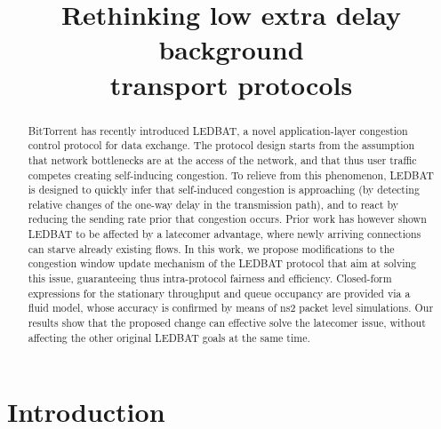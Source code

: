 \documentclass[conference]{IEEEtran}
\begin{document}
\title{Rethinking low extra delay background\\ transport protocols}
\author{
}

\maketitle

\begin{abstract}
BitTorrent has recently introduced LEDBAT, a novel application-layer congestion control protocol for data exchange. The protocol design starts from the assumption that network bottlenecks are at the access of the network, and that thus user traffic competes creating self-inducing congestion. To relieve from this phenomenon, LEDBAT is designed to quickly infer that self-induced congestion is approaching (by detecting  relative changes of the one-way delay in the transmission path), and to react by reducing the sending rate prior that congestion occurs. Prior work has however shown LEDBAT to be affected by a latecomer advantage, where newly arriving connections can starve already existing flows.
In this work, we propose modifications to the congestion window update mechanism of the LEDBAT protocol that aim at solving this issue, guaranteeing thus intra-protocol fairness and efficiency.
Closed-form expressions for the stationary throughput and queue occupancy are provided via a fluid model, whose accuracy is confirmed by means of ns2 packet level simulations.
Our results show that the proposed change can effective solve the latecomer issue, without affecting the other original LEDBAT goals at the same time.
\end{abstract}


\section{Introduction}\label{sec:intro}
\end{document}
